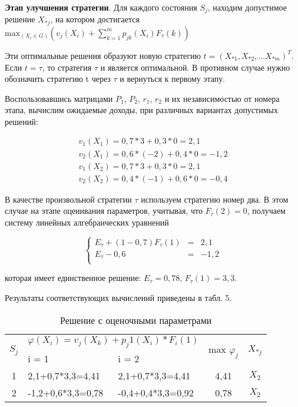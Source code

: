 \textbf{Этап улучшения стратегии}. Для каждого состояния $S_j$, находим допустимое решение $X_{*j}$, на котором достигается $\text{max}_{(X_i \in G)}(v_j (X_i) + \sum\limits_{k=1}^m p_{jk}(X_i) F_\tau(k))$

Эти оптимальные решения образуют новую стратегию $t = (X_{*1}, X_{*2}, … X_{*m})^T$. Если $t = \tau$, то стратегия $\tau$ и является оптимальной. В противном случае нужно обозначить стратегию t через $\tau$ и вернуться к первому этапу.

Воспользовавшись матрицами $P_1$, $P_2$, $r_1$, $r_2$ и их независимостью от номера этапа, вычислим ожидаемые доходы, при различных вариантах допустимых решений:

\begin{eqnarray*}
v_1 (X_1 )=0,7*3 + 0,3*0=2,1		\\
v_2 (X_1 )=0,6*(-2) + 0,4*0=-1,2	\\
v_1 (X_2 )=0,7*3 + 0,3*0=2,1		\\
v_2 (X_2 )=0,4*(-1) + 0,6*0=-0,4
\end{eqnarray*}

В качестве произвольной стратегии $\tau$ используем стратегию номер два. В этом случае на этапе оценивания параметров, учитывая, что $F_\tau(2)=0$, получаем систему линейных алгебраических уравнений

$$
\left\{
	\begin{aligned}
	E_\tau + (1 - 0,7) F_\tau(1) &= & 2,1\\
	E_\tau - 0,6 &= & -1,2\\
	\end{aligned}
\right.
$$

которая имеет единственное решение: $E_\tau = 0,78$, $F_\tau(1) = 3,3$.

Результаты соответствующих вычислений приведены в табл. 5.

\begin{table}[htb]
	\begin{tabularx}{\textwidth}{|c|X|X|c|c|}
	\hline
	\multirow{2}{*}{$S_j$} & \multicolumn{2}{c|}{$\varphi (X_i )=v_j (X_k )+p_j1 (X_i)*F_i (1)$} & \multirow{2}{*}{max $\varphi_j$} & \multirow{2}{*}{$X_{*j}$} \\ 
	\hhline{~--~~}
	{} & i = 1 & i = 2 & {} & {} \\ 
	\hline 
	1 & 2,1+0,7*3,3=4,41 & 2,1+0,7*3,3=4,41 & 4,41 & $X_2$ \\ 
	\hline 
	2 & -1,2+0,6*3,3=0,78 & -0,4+0,4*3,3=0,92 & 0,78 & $X_2$ \\ 
	\hline
	\end{tabularx}
\caption{Решение с оценочными параметрами}
\end{table}

